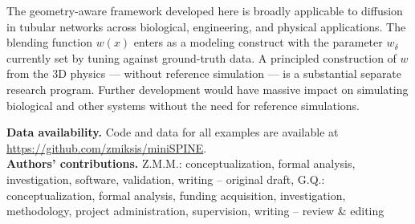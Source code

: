 \documentclass[11pt]{article}
\begin{document}
The geometry-aware framework developed here is broadly applicable to diffusion in tubular networks across biological, engineering, and physical applications. The blending function $w(x)$ enters as a modeling construct with the parameter $w_\delta$ currently set by tuning against ground-truth data. A principled construction of $w$ from the 3D physics --- without reference simulation --- is a substantial separate research program. Further development would have massive impact on simulating biological \cite{Grein2014,Breit2016,Breit2018,Rosado2022, Shirinpour2021,YKA1991,BRNQ2023} and other systems without the need for reference simulations.



\vspace{2em}
\noindent \textbf{Data availability.} Code and data for all examples are available at \url{https://github.com/zmiksis/miniSPINE}.\\
\noindent \textbf{Authors’ contributions.} Z.M.M.: conceptualization, formal analysis, investigation, software, validation, writing -- original draft, G.Q.: conceptualization, formal analysis, funding acquisition, investigation, methodology, project administration, supervision, writing -- review \& editing \\





\end{document}
